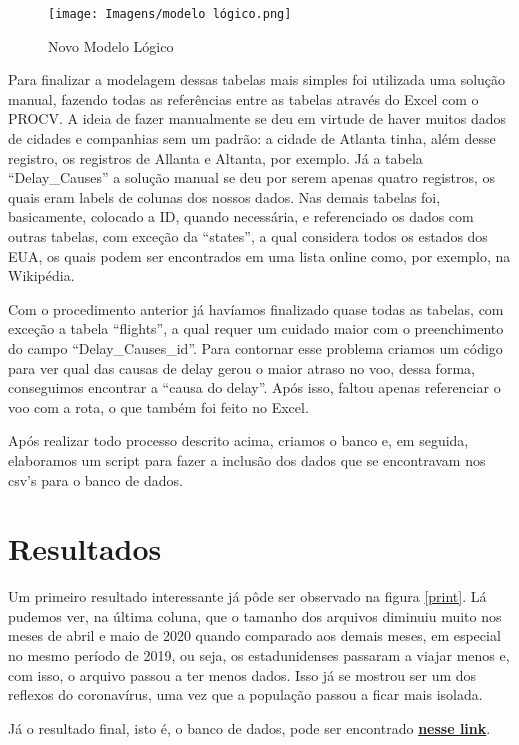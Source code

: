 \documentclass{article}
\begin{document}
	\begin{figure}
		\centering
		\texttt{[image: Imagens/modelo lógico.png]}
		\caption{Novo Modelo Lógico}
		\label{new_lógico}
	\end{figure}
	
	Para finalizar a modelagem dessas tabelas mais simples foi utilizada uma solução manual, fazendo todas as referências entre as tabelas através do Excel com o PROCV. A ideia de fazer manualmente se deu em virtude de haver muitos dados de cidades e companhias sem um padrão: a cidade de Atlanta tinha, além desse registro, os registros de Allanta e Altanta, por exemplo. Já a tabela ``Delay\_Causes'' a solução manual se deu por serem apenas quatro registros, os quais eram labels de colunas dos nossos dados. Nas demais tabelas foi, basicamente, colocado a ID, quando necessária, e referenciado os dados com outras tabelas, com exceção da ``states'', a qual considera todos os estados dos EUA, os quais podem ser encontrados em uma lista online como, por exemplo, na Wikipédia.
	
	Com o procedimento anterior já havíamos finalizado quase todas as tabelas, com exceção a tabela ``flights'', a qual requer um cuidado maior com o preenchimento do campo ``Delay\_Causes\_id''. Para contornar esse problema criamos um código para ver qual das causas de delay gerou o maior atraso no voo, dessa forma, conseguimos encontrar a ``causa do delay''. Após isso, faltou apenas referenciar o voo com a rota, o que também foi feito no Excel.
	
	Após realizar todo processo descrito acima, criamos o banco e, em seguida, elaboramos um script para fazer a inclusão dos dados que se encontravam nos csv's para o banco de dados.
	
	\section{Resultados}
	
	Um primeiro resultado interessante já pôde ser observado na figura \ref{print}. Lá pudemos ver, na última coluna, que o tamanho dos arquivos diminuiu muito nos meses de abril e maio de 2020 quando comparado aos demais meses, em especial no mesmo período de 2019, ou seja, os estadunidenses passaram a viajar menos e, com isso, o arquivo passou a ter menos dados. Isso já se mostrou ser um dos reflexos do coronavírus, uma vez que a população passou a ficar mais isolada.
	
	Já o resultado final, isto é, o banco de dados, pode ser encontrado \href{https://gvmail-my.sharepoint.com/:f:/g/personal/b39254_fgv_edu_br/Ev8i0xwOqnFFh_q3gTqvNAkBhzL_dpV6_ljzh82vJsTnNg?e=7ubrsl}{\textbf{nesse link}}.
	
	\printbibliography
	
\end{document}
